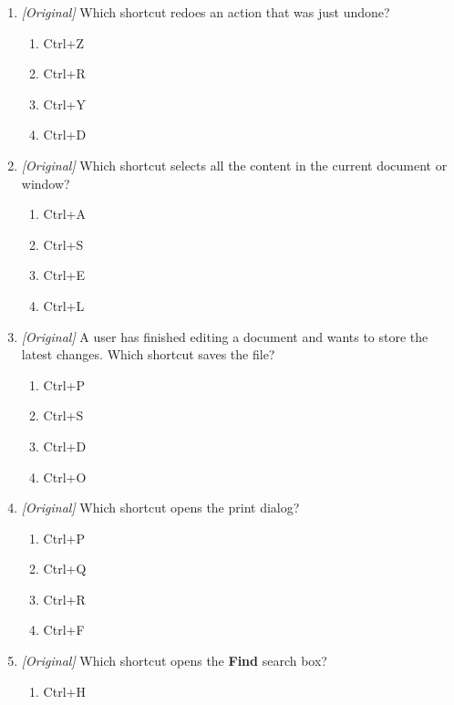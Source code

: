 \documentclass[11pt]{article}
\begin{document}
\begin{enumerate}[label=\textbf{Q\arabic*.}, leftmargin=*]
  \begin{enumerate}[label=\Alph*.]
    \item Ctrl+Y
    \item Ctrl+Z
    \item Ctrl+U
    \item Ctrl+A
  \end{enumerate}
\item \textit{[Original]} Which shortcut redoes an action that was just
  undone?
  \begin{enumerate}[label=\Alph*.]
    \item Ctrl+Z
    \item Ctrl+R
    \item Ctrl+Y
    \item Ctrl+D
  \end{enumerate}
\item \textit{[Original]} Which shortcut selects all the content in the
  current document or window?
  \begin{enumerate}[label=\Alph*.]
    \item Ctrl+A
    \item Ctrl+S
    \item Ctrl+E
    \item Ctrl+L
  \end{enumerate}
\item \textit{[Original]} A user has finished editing a document and wants to
  store the latest changes. Which shortcut saves the file?
  \begin{enumerate}[label=\Alph*.]
    \item Ctrl+P
    \item Ctrl+S
    \item Ctrl+D
    \item Ctrl+O
  \end{enumerate}
\item \textit{[Original]} Which shortcut opens the print dialog?
  \begin{enumerate}[label=\Alph*.]
    \item Ctrl+P
    \item Ctrl+Q
    \item Ctrl+R
    \item Ctrl+F
  \end{enumerate}
\item \textit{[Original]} Which shortcut opens the \textbf{Find} search box?
  \begin{enumerate}[label=\Alph*.]
    \item Ctrl+H

\end{enumerate}
\end{enumerate}
\end{document}
